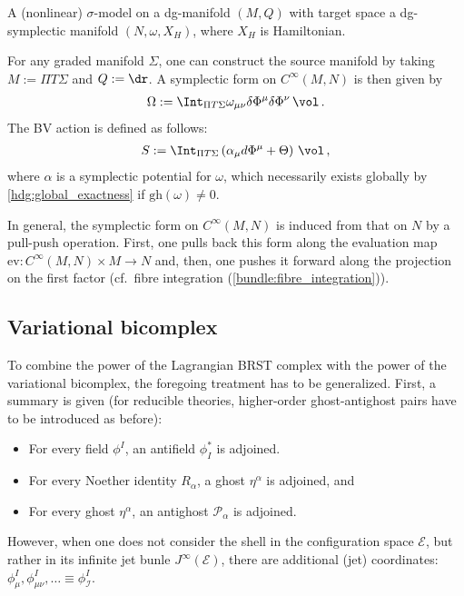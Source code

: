     \begin{example}
        A (nonlinear) $\sigma$-model on a dg-manifold $(M,Q)$ with target space a dg-symplectic manifold $(N,\omega,X_H)$, where $X_H$ is Hamiltonian.

        For any graded manifold $\Sigma$, one can construct the source manifold by taking $M:=\Pi T\Sigma$ and $Q:=\dr$. A symplectic form on $C^\infty(M,N)$ is then given by
        \begin{gather}
            \Omega := \Int_{\Pi T\Sigma}\omega_{\mu\nu}\delta\Phi^\mu\delta\Phi^\nu\,\vol\,.
        \end{gather}
        The BV action is defined as follows:
        \begin{gather}
            S := \Int_{\Pi T\Sigma}\left(\alpha_\mu d\Phi^\mu+\Theta\right)\,\vol\,,
        \end{gather}
        where $\alpha$ is a symplectic potential for $\omega$, which necessarily exists globally by \cref{hdg:global_exactness} if $\mathrm{gh}(\omega)\neq0$.

        In general, the symplectic form on $C^\infty(M,N)$ is induced from that on $N$ by a pull-push operation. First, one pulls back this form along the evaluation map $\mathrm{ev}:C^\infty(M,N)\times M\rightarrow N$ and, then, one pushes it forward along the projection on the first factor (cf.~fibre integration (\cref{bundle:fibre_integration})).

    \end{example}

\subsection{Variational bicomplex}

    To combine the power of the Lagrangian BRST complex with the power of the variational bicomplex, the foregoing treatment has to be generalized. First, a summary is given (for reducible theories, higher-order ghost-antighost pairs have to be introduced as before):
    \begin{itemize}
        \item For every field $\phi^I$, an antifield $\phi_I^*$ is adjoined.
        \item For every Noether identity $R_\alpha$, a ghost $\eta^\alpha$ is adjoined, and
        \item For every ghost $\eta^\alpha$, an antighost $\mathcal{P}_\alpha$ is adjoined.
    \end{itemize}
    However, when one does not consider the shell in the configuration space $\mathcal{E}$, but rather in its infinite jet bunle $J^\infty(\mathcal{E})$, there are additional (jet) coordinates: $\phi^I_\mu,\phi^I_{\mu\nu},\ldots\equiv\phi^I_{\mathcal{I}}$.

